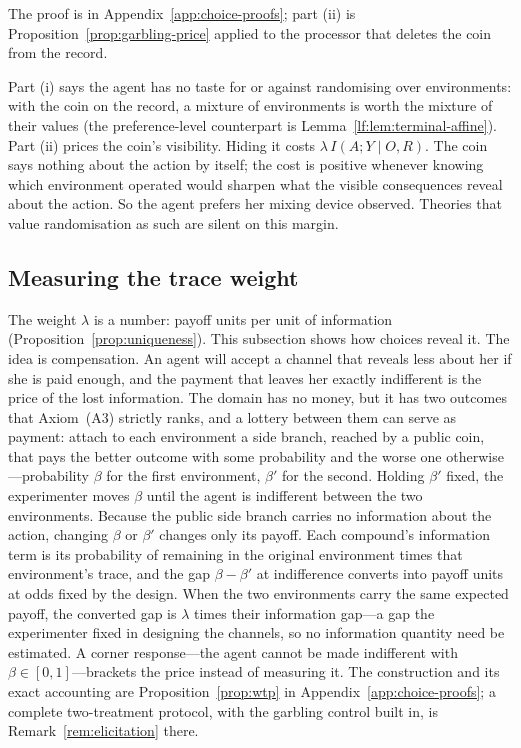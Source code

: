 \documentclass[11pt,a4paper]{article}
\theoremstyle{definition}
\newcommand{\I}{I}
\newcommand{\1}{\mathbf 1}
\begin{document}
The proof is in Appendix~\ref{app:choice-proofs}; part \textup{(ii)} is
Proposition~\ref{prop:garbling-price} applied to the processor that deletes the coin from the record.

Part \textup{(i)} says the agent has no taste for or against randomising over environments: with the coin on the
record, a mixture of environments is worth the mixture of their values (the preference-level counterpart is
Lemma~\ref{lf:lem:terminal-affine}).  Part \textup{(ii)} prices the coin's visibility.  Hiding it costs
$\lambda\,\I(A;Y\mid O,R)$.  The coin says nothing about the action by itself; the cost is positive whenever
knowing which environment operated would sharpen what the visible consequences reveal about the action.  So the
agent prefers her mixing device observed.  Theories that value randomisation as such are silent on this margin.

\subsection{Measuring the trace weight}\label{sec:measurement}

The weight $\lambda$ is a number: payoff units per unit of information (Proposition~\ref{prop:uniqueness}).
This subsection shows how choices reveal it.  The idea is compensation.  An agent will accept a channel that
reveals less about her if she is paid enough, and the payment that leaves her exactly indifferent is the price
of the lost information.  The domain has no money, but it has two outcomes that Axiom~\textup{(A3)} strictly
ranks, and a lottery between them can serve as payment: attach to each environment a side branch, reached by a
public coin, that pays the better outcome with some probability and the worse one otherwise---probability
$\beta$ for the first environment, $\beta'$ for the second.  Holding $\beta'$ fixed, the experimenter moves
$\beta$ until the agent is indifferent between the two environments.  Because the public side branch carries no
information about the action, changing $\beta$ or $\beta'$ changes only its payoff.  Each compound's
information term is its probability of remaining in the original environment times that environment's trace,
and the gap $\beta-\beta'$ at indifference converts into payoff units at odds fixed by the design.  When the two environments carry the same expected
payoff, the converted gap is $\lambda$ times their information gap---a gap the experimenter fixed in designing
the channels, so no information quantity need be estimated.  A corner response---the agent cannot be made
indifferent with $\beta\in[0,1]$---brackets the price instead of measuring it.  The construction and its
exact accounting are Proposition~\ref{prop:wtp} in Appendix~\ref{app:choice-proofs}; a complete two-treatment
protocol, with the garbling control built in, is Remark~\ref{rem:elicitation} there.
\end{document}
